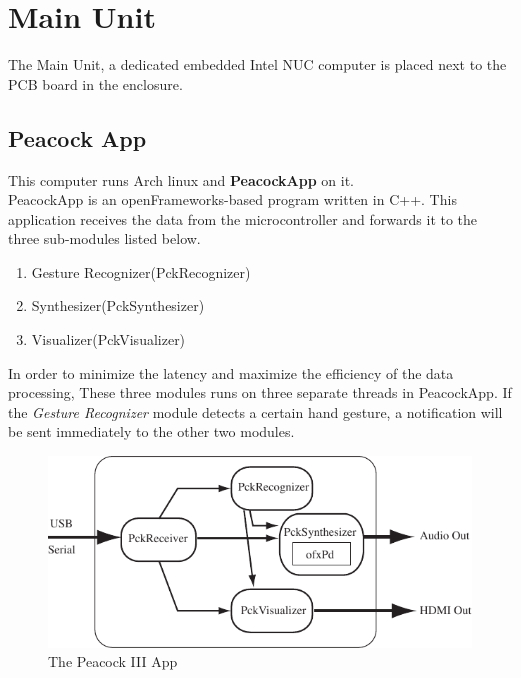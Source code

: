 \documentclass{nime-alternate}
\begin{document}
\section{Main Unit} %
The Main Unit, a dedicated embedded Intel NUC computer\cite{intel:nuc} is placed next to the PCB board in the enclosure.

\subsection{Peacock App}

This computer runs Arch linux and {\bf PeacockApp} on it. \\
PeacockApp is an openFrameworks\cite{openframeworks}-based program written in C++. This application receives the data from the microcontroller and forwards it to the three sub-modules listed below. 

\begin{enumerate}
       \item Gesture Recognizer(PckRecognizer)
       \item Synthesizer(PckSynthesizer)
       \item Visualizer(PckVisualizer)
\end{enumerate}

In order to minimize the latency and maximize the efficiency of the data processing, These three modules runs on three separate threads in PeacockApp. If the {\it Gesture Recognizer} module detects a certain hand gesture, a notification will be sent immediately to the other two modules.

\begin{figure}[htbp]
       \begin{center}
              \includegraphics[width=1\columnwidth]{Peacock_app.pdf}
       \end{center}
       \caption{The Peacock III App}
       \label{fig:modules}
\end{figure}
\end{document}
